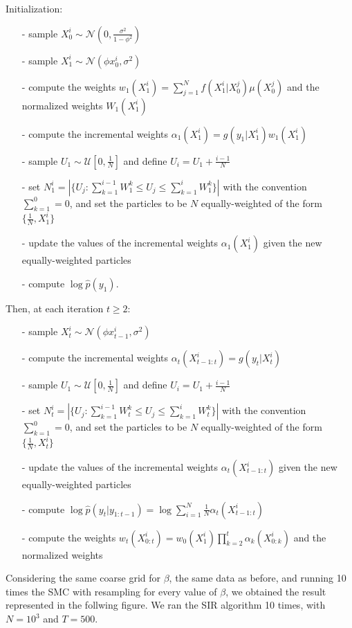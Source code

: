 \documentclass[]{article}
\begin{document}
Initialization:
\begin{enumerate}
	\item[-] sample $X_0^i \sim \mathcal{N}(0, \frac{\sigma^2}{1-\phi^2})$
	\item[-] sample $X_1^i \sim \mathcal{N}(\phi x_0^i,\sigma^2) $ 
	\item[-] compute the weights $w_1(X_1^i) = \sum_{j=1}^{N}f(X_1^i|X_0^j)\mu(X_0^j)$ and the normalized weights $W_1(X_1^i)$
	\item[-] compute the incremental weights $ \alpha_1(X_1^i) = g(y_1|X_1^i)w_1(X_1^i) $
	\item[-] sample $U_1 \sim \mathcal{U}[0, \frac{1}{N}]$ and define $U_i = U_1 + \frac{i-1}{N}$
	\item[-] set $N_1^i = |\{ U_j: \sum_{k=1}^{i-1}W_1^k \leq U_j \leq \sum_{k=1}^{i}W_1^k \}|$ with the convention $\sum_{k=1}^{0}=0$, and set the particles to be $N$ equally-weighted of the form $\{\frac{1}{N}, X_1^i\}$
	\item[-] update the values of the incremental weights  $ \alpha_1(X_1^i) $ given the new equally-weighted particles
	\item[-] compute $\log \hat{p}(y_1)$. 
\end{enumerate}
Then, at each iteration $t \geq 2$:
\begin{enumerate}
	\item[-] sample $X_t^i \sim \mathcal{N}(\phi x_{t-1}^i,\sigma^2) $
	\item[-] compute the incremental weights $ \alpha_t(X_{t-1:t}^i) = g(y_t|X_t^i) $
	\item[-] sample $U_1 \sim \mathcal{U}[0, \frac{1}{N}]$ and define $U_i = U_1 + \frac{i-1}{N}$
	\item[-] set $N_t^i = |\{ U_j: \sum_{k=1}^{i-1}W_t^k \leq U_j \leq \sum_{k=1}^{i}W_t^k \}|$ with the convention $\sum_{k=1}^{0}=0$, and set the particles to be $N$ equally-weighted of the form $\{\frac{1}{N}, X_t^i\}$
	\item[-] update the values of the incremental weights  $ \alpha_t(X_{t-1:t}^i) $ given the new equally-weighted particles
	\item[-] compute $\log \hat{p}(y_t|y_{1:t-1})=\log\sum_{i=1}^{N}\frac{1}{N}\alpha_t(X_{t-1:t}^i)$
	\item[-] compute the weights $
	w_t(X_{0:t}^i)=w_0(X_1^i)\prod_{k=2}^{t}\alpha_k(X_{0:k}^i)$ and the normalized weights
\end{enumerate}
Considering the same coarse grid for $\beta$, the same data as before, and running 10 times the SMC with resampling for every value of $\beta$, we obtained the result represented in the follwing figure. We ran the SIR algorithm 10 times,  with $N=10^3$ and $T=500$.
\end{document}

